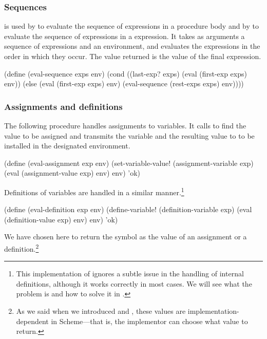 \subsubsection*{Sequences}

 is used by  to evaluate the sequence of
expressions in a procedure body and by  to evaluate the sequence of
expressions in a  expression.  It takes as arguments a sequence of
expressions and an environment, and evaluates the expressions in the order in
which they occur.  The value returned is the value of the final expression.

\begin{codeBlock}
(define (eval-sequence exps env)
  (cond ((last-exp? exps)
         (eval (first-exp exps) env))
        (else
         (eval (first-exp exps) env)
         (eval-sequence (rest-exps exps) env))))
\end{codeBlock}

\subsubsection*{Assignments and definitions}

The following procedure handles assignments to variables.  It calls 
to find the value to be assigned and transmits the variable and the resulting
value to  to be installed in the designated
environment.

\begin{codeBlock}
(define (eval-assignment exp env)
  (set-variable-value! (assignment-variable exp)
                       (eval (assignment-value exp)
                             env)
                       env)
  'ok)
\end{codeBlock}

\noindent
Definitions of variables are handled in a similar manner.\footnote{This
implementation of  ignores a subtle issue in the handling of
internal definitions, although it works correctly in most cases.  We will see
what the problem is and how to solve it in .}

\begin{codeBlock}
(define (eval-definition exp env)
  (define-variable! (definition-variable exp)
                    (eval (definition-value exp) env)
                    env)
  'ok)
\end{codeBlock}

\noindent
We have chosen here to return the symbol  as the value of an
assignment or a definition.\footnote{As we said when we introduced
 and , these values are implementation-dependent in
Scheme---that is, the implementor can choose what value to return.}

